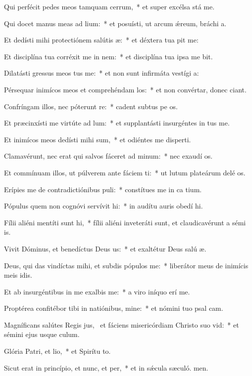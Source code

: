 \item Qui perfécit pedes meos tamquam cerrum,~* et super excélsa stá me.
\item Qui docet manus meas ad lium:~* et posuísti, ut arcum ǽreum, bráchi a.
\item Et dedísti mihi protectiónem salútis æ:~* et déxtera tua pit me:
\item Et disciplína tua corréxit me in nem:~* et disciplína tua ipsa me bit.
\item Dilatásti gressus meos tus me:~* et non sunt infirmáta vestígi a:
\item Pérsequar inimícos meos et comprehéndam los:~* et non convértar, donec ciant.
\item Confríngam illos, nec póterunt re:~* cadent subtus pe os.
\item Et præcinxísti me virtúte ad lum:~* et supplantásti insurgéntes in  tus me.
\item Et inimícos meos dedísti mihi sum,~* et odiéntes me disperti.
\item Clamavérunt, nec erat qui salvos fáceret ad minum:~* nec exaudí os.
\item Et commínuam illos, ut púlverem ante fáciem ti:~* ut lutum plateárum delé os.
\item Erípies me de contradictiónibus puli:~* constítues me in ca tium.
\item Pópulus quem non cognóvi servívit hi:~* in audítu auris obedí hi.
\item Fílii aliéni mentíti sunt hi,~* fílii aliéni inveteráti sunt, et claudicavérunt a sémi is.
\item Vivit Dóminus, et benedíctus Deus us:~* et exaltétur Deus salú æ.
\item Deus, qui das vindíctas mihi, et subdis pópulos  me:~* liberátor meus de inimícis meis idis.
\item Et ab insurgéntibus in me exalbis me:~* a viro iníquo erí me.
\item Proptérea confitébor tibi in natiónibus, mine:~* et nómini tuo psal cam.
\item Magníficans salútes Regis jus,~\pscross{} et fáciens misericórdiam Christo suo vid:~* et sémini ejus usque  culum.
\item Glória Patri, et lio,~* et Spirítu to.
\item Sicut erat in princípio, et nunc, et per,~* et in sǽcula sæculó. men.
